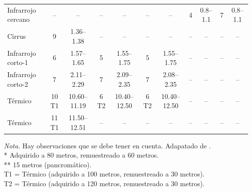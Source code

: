 \begin{table}[H]
\begin{spacing}{8}
\begin{tabularx}{\linewidth}{P{3cm}*{10}{c}}
                                Infrarrojo cercano & -- & -- & -- & -- & -- & -- & 4 & 0.8–1.1 & 7 & 0.8–1.1 \\
                                Cirrus & 9 & 1.36–1.38 & -- & -- & -- & -- & -- & -- & -- & -- \\
                                Infrarrojo corto-1 & 6 & 1.57–1.65 & 5 & 1.55–1.75 & 5 & 1.55–1.75 & -- & -- & -- & -- \\
                                Infrarrojo corto-2 & 7 & 2.11–2.29 & 7 & 2.09–2.35 & 7 & 2.08–2.35 & -- & -- & -- & -- \\
                                Térmico & 10 T1 & 10.60–11.19 & 6 T2 & 10.40–12.50 & 6 T2 & 10.40–12.50 & -- & -- & -- & -- \\
                                Térmico & 11 T1 & 11.50–12.51 & -- & -- & -- & -- & -- & -- & -- & -- \\
                                \bottomrule
                            \end{tabularx}
                        \end{spacing}
                        \vspace{1\baselineskip}
                        \textit{Nota.} Hay observaciones que se debe tener en cuenta. Adapatado de \textcite{Landsat2023}. \\
                            * Adquirido a 80 metros, remuestreado a 60 metros. \\
                            ** 15 metros (pancromático). \\
                            T1 = Térmico (adquirido a 100 metros, remuestreado a 30 metros). \\
                            T2 = Térmico (adquirido a 120 metros, remuestreado a 30 metros). 
                        \label{BandasLandsat}
                    \end{table}
                
